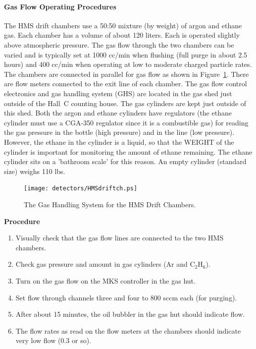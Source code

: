 \paragraph {Gas Flow Operating Procedures}

The HMS drift chambers use a 50:50 mixture (by weight) of argon and
ethane gas.  Each chamber has a volume of about 120 liters.  Each is
operated slightly above atmospheric pressure.  The gas flow through
the two chambers can be varied and is typically set at 1000 cc/min
when flushing (full purge in about 2.5 hours) and 400 cc/min when operating
at low to moderate charged particle rates.  The chambers are connected
in parallel for gas flow as shown in Figure~\ref{fig:5.1}.  There are flow meters 
connected
to the exit line of each chamber.  The gas flow control electronics
and gas handling system (GHS) are located in the gas shed just outside
of the Hall~C counting house.  The gas cylinders are kept just outside of
this shed.  Both the argon and ethane cylinders have regulators (the ethane
cylinder must use a CGA-350 regulator since it is a combustible gas) for
reading the gas pressure in the bottle (high pressure) and in the line (low
pressure).  However, the ethane
in the cylinder is a liquid, so that the WEIGHT of the cylinder is important
for monitoring the amount of ethane remaining.  The ethane
cylinder sits on a 'bathroom scale' for this reason.  An empty cylinder
(standard size) weighs 110 lbs.

\begin{figure}
\texttt{[image: detectors/HMSdriftch.ps]}
\caption{The Gas Handling System for the HMS Drift Chambers. \label{fig:5.1}}
\end{figure}

\begin{center}
{\bf Procedure}
\end{center}

\begin{enumerate}
\item {Visually check that the gas flow lines are connected to the two
HMS chambers.}
\item {Check gas pressure and amount in gas cylinders (Ar and C$_2$H$_6$).}
\item {Turn on the gas flow on the MKS controller in the gas hut.}
\item {Set flow through channels three and four to 800 sccm each
(for purging).}
\item {After about 15 minutes, the oil bubbler in the gas hut should
indicate flow.}
\item {The flow rates as read on the flow meters at the chambers should
indicate very low flow (0.3 or so).}
\end{enumerate}

